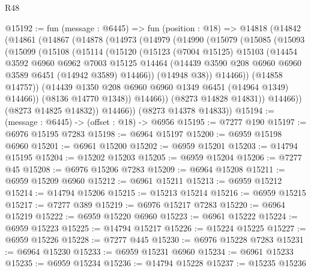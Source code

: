 \begin{lexlean}{R48}
\begin{coremodule}
@15192 := fun (message : @6445) =>
  fun (position : @18) =>
  @14818
    (@14842
      (@14861
        (@14867
          (@14878
            (@14973
              (@14979
                (@14990
                  (@15079
                    (@15085
                      (@15093
                        (@15099
                          (@15108
                            (@15114
                              (@15120
                                (@15123
                                  (@7004 @15125)
                                  @15103
                                  (@14454
                                    @3592
                                    @6960
                                    @6962
                                    @7003
                                    @15125
                                    @14464
                                    (@14439
                                      @3590
                                      @208
                                      @6960
                                      @6960
                                      @3589
                                      @6451
                                      (@14942 @3589)
                                      @14466))
                                  (@14948 @38))
                                @14466))
                            (@14858 @14757))
                          (@14439 @1350 @208 @6960 @6960 @1349 @6451 (@14964 @1349) @14466))
                        (@8136 @14770 @1348))
                      @14466))
                  (@8273 @14828 @14831))
                @14466))
            (@8273 @14825 @14832))
          @14466))
      (@8273 @14378 @14833))
@15194 := (message : @6445) -> (offset : @18) -> @6956
@15195 := @7277 @190
@15197 := @6976 @15195 @7283
@15198 := @6964 @15197
@15200 := @6959 @15198 @6960
@15201 := @6961 @15200
@15202 := @6959 @15201
@15203 := @14794 @15195
@15204 := @15202 @15203
@15205 := @6959 @15204
@15206 := @7277 @45
@15208 := @6976 @15206 @7283
@15209 := @6964 @15208
@15211 := @6959 @15209 @6960
@15212 := @6961 @15211
@15213 := @6959 @15212
@15214 := @14794 @15206
@15215 := @15213 @15214
@15216 := @6959 @15215
@15217 := @7277 @389
@15219 := @6976 @15217 @7283
@15220 := @6964 @15219
@15222 := @6959 @15220 @6960
@15223 := @6961 @15222
@15224 := @6959 @15223
@15225 := @14794 @15217
@15226 := @15224 @15225
@15227 := @6959 @15226
@15228 := @7277 @445
@15230 := @6976 @15228 @7283
@15231 := @6964 @15230
@15233 := @6959 @15231 @6960
@15234 := @6961 @15233
@15235 := @6959 @15234
@15236 := @14794 @15228
@15237 := @15235 @15236

\end{coremodule}
\end{lexlean}
